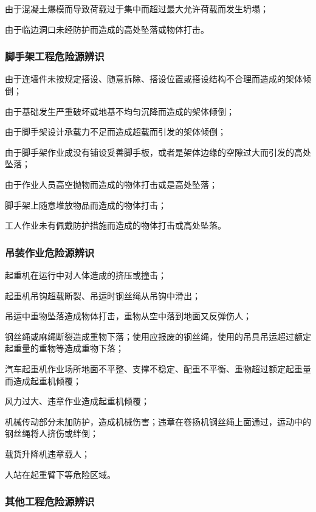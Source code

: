  由于混凝土爆模而导致荷载过于集中而超过最大允许荷载而发生坍塌；

 由于临边洞口未经防护而造成的高处坠落或物体打击。

\subsubsection{脚手架工程危险源辨识}

 由于连墙件未按规定搭设、随意拆除、搭设位置或搭设结构不合理而造成的架体倾倒；

 由于基础发生严重破坏或地基不均匀沉降而造成的架体倾倒；

 由于脚手架设计承载力不足而造成超载而引发的架体倾倒；

 由于脚手架作业成没有铺设妥善脚手板，或者是架体边缘的空隙过大而引发的高处坠落；

 由于作业人员高空抛物而造成的物体打击或是高处坠落；

 脚手架上随意堆放物品而造成的物体打击；

 工人作业未有佩戴防护措施而造成的物体打击或高处坠落。

\subsubsection{吊装作业危险源辨识}

 起重机在运行中对人体造成的挤压或撞击；

 起重机吊钩超载断裂、吊运时钢丝绳从吊钩中滑出；

 吊运中重物坠落造成物体打击，重物从空中落到地面又反弹伤人；

 钢丝绳或麻绳断裂造成重物下落；使用应报废的钢丝绳，使用的吊具吊运超过额定起重量的重物等造成重物下落；

 汽车起重机作业场所地面不平整、支撑不稳定、配重不平衡、重物超过额定起重量而造成起重机倾覆；

 风力过大、违章作业造成起重机倾覆；

 机械传动部分未加防护，造成机械伤害；违章在卷扬机钢丝绳上面通过，运动中的钢丝绳将人挤伤或绊倒；

 载货升降机违章载人；

 人站在起重臂下等危险区域。

\subsubsection{其他工程危险源辨识}

